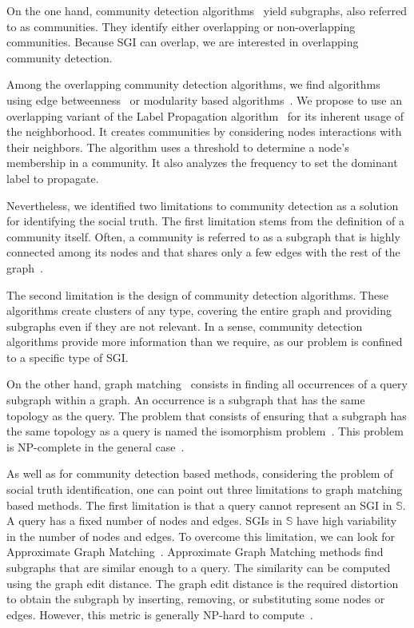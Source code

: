 \documentclass{llncs}
\begin{document}
On the one hand, community detection algorithms~\cite{Fortunato2010} yield subgraphs, also referred to as communities.
They identify either overlapping or non-overlapping communities.
Because SGI can overlap, we are interested in overlapping community detection.

Among the overlapping community detection algorithms, we find algorithms using edge betweenness~\cite{Girvan2002} or modularity based algorithms~\cite{Singh2022}.
We propose to use an overlapping variant of the Label Propagation algorithm~\cite{Zhu2002,Liu2021} for its inherent usage of the neighborhood.
It creates communities by considering nodes interactions with their neighbors.
The algorithm uses a threshold to determine a node's membership in a community.
It also analyzes the frequency to set the dominant label to propagate.

Nevertheless, we identified two limitations to community detection as a solution for identifying the social truth.
The first limitation stems from the definition of a community itself.
Often, a community is referred to as a subgraph that is highly connected among its nodes and that shares only a few edges with the rest of the graph~\cite{Fortunato2010}.

The second limitation is the design of community detection algorithms.
These algorithms create clusters of any type, covering the entire graph and providing subgraphs even if they are not relevant.
In a sense, community detection algorithms provide more information than we require, as our problem is confined to a specific type of SGI.\@

On the other hand, graph matching~\cite{Yan2016} consists in finding all occurrences of a query subgraph within a graph.
An occurrence is a subgraph that has the same topology as the query.
The problem that consists of ensuring that a subgraph has the same topology as a query is named the isomorphism problem~\cite{Grohe2020}.
This problem is NP-complete in the general case~\cite{Babai2016}.

As well as for community detection based methods, considering the problem of social truth identification, one can point out three limitations to graph matching based methods.
The first limitation is that a query cannot represent an SGI in \(\mathbb{S}\).
A query has a fixed number of nodes and edges.
SGIs in \(\mathbb{S}\) have high variability in the number of nodes and edges.
To overcome this limitation, we can look for Approximate Graph Matching~\cite{Yan2016, Gallagher2006}.
Approximate Graph Matching methods find subgraphs that are similar enough to a query.
The similarity can be computed using the graph edit distance.
The graph edit distance is the required distortion to obtain the subgraph by inserting, removing, or substituting some nodes or edges.
However, this metric is generally NP-hard to compute~\cite{Zeng2009}.
\end{document}
